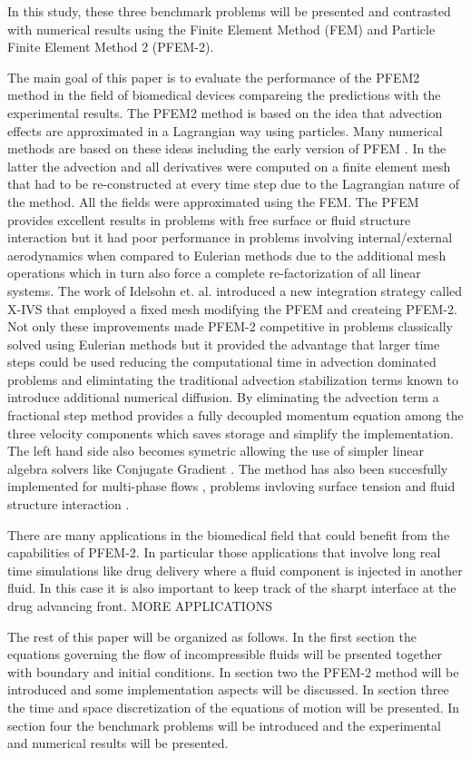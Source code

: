 In this study, these three benchmark problems will be presented and contrasted with numerical results using the Finite Element Method (FEM) and Particle Finite Element Method 2 (PFEM-2).


The main goal of this paper is to evaluate the performance of the PFEM2 method in the field of biomedical devices compareing the predictions with the experimental results. The PFEM2 method is based on the idea that advection effects are approximated in a Lagrangian way using particles. Many numerical methods are based on these ideas \cite{sph,mps,pic,mac} including the early version of PFEM \cite{sergio:PFEM}. In the latter the advection and all derivatives were computed on a finite element mesh that had to be re-constructed at every time step due to the Lagrangian nature of the method. All the fields were approximated using the FEM. The PFEM provides excellent results in problems with free surface or fluid structure interaction but it had poor performance in problems involving internal/external aerodynamics when compared to Eulerian methods due to the additional mesh operations which in turn also force a complete re-factorization of all linear systems. The work of Idelsohn et. al. \cite{sergio:xivs1,sergio:xivs2} introduced a new integration strategy called X-IVS that employed a fixed mesh modifying the PFEM and createing PFEM-2. Not only these improvements made PFEM-2 competitive in problems classically solved using Eulerian methods but it provided the advantage that larger time steps could be used \cite{gimenez:parallel} reducing the computational time in advection dominated problems and elimintating the traditional advection stabilization terms known to introduce additional numerical diffusion. By eliminating the advection term a fractional step method provides a fully decoupled momentum equation among the three velocity components which saves storage and simplify the implementation. The left hand side also becomes symetric allowing the use of simpler linear algebra solvers like Conjugate Gradient \cite{conjgrad}. The method has also been succesfully implemented for multi-phase flows \cite{sergio:pfem2_lts,gimenez:fs,gimenez:tesis}, problems invloving surface tension \cite{gimenez:st} and fluid structure interaction \cite{pablo:FSI}.

There are many applications in the biomedical field that could benefit from the capabilities of PFEM-2. In particular those applications that involve long real time simulations like drug delivery where a fluid component is injected in another fluid. In this case it is also important to keep track of the sharpt interface at the drug advancing front. {MORE APPLICATIONS}

The rest of this paper will be organized as follows. 
In the first section the equations governing the flow of incompressible fluids will be prsented together with boundary and initial conditions. 
In section two the PFEM-2 method will be introduced and some implementation aspects will be discussed.
In section three the time and space discretization of the equations of motion will be presented. 
In section four the benchmark problems will be introduced and the experimental and numerical results will be presented.
